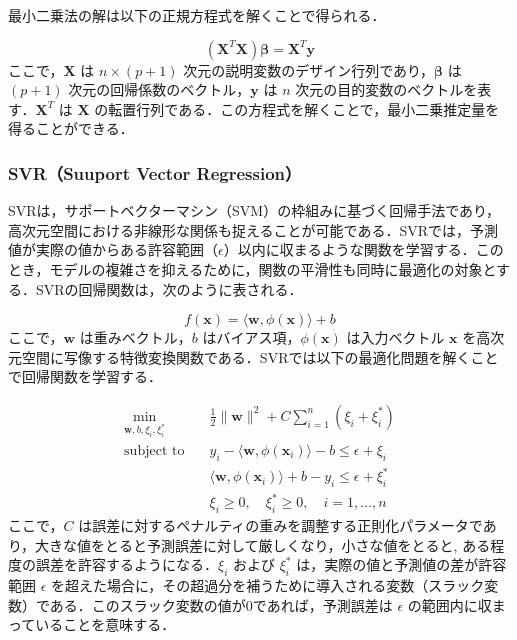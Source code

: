 最小二乗法の解は以下の正規方程式を解くことで得られる．

\begin{equation}
	(\mathbf{X}^T \mathbf{X}) \mathbf{\beta} = \mathbf{X}^T \mathbf{y}
\end{equation}
ここで，$\mathbf{X}$ は $n \times (p+1)$ 次元の説明変数のデザイン行列であり，$\mathbf{\beta}$ は $(p+1)$ 次元の回帰係数のベクトル，$\mathbf{y}$ は $n$ 次元の目的変数のベクトルを表す．$\mathbf{X}^T$ は $\mathbf{X}$ の転置行列である．この方程式を解くことで，最小二乗推定量を得ることができる．

\subsubsection*{SVR（Suuport Vector Regression）}
SVRは，サポートベクターマシン（SVM）の枠組みに基づく回帰手法であり，高次元空間における非線形な関係も捉えることが可能である\cite{prml}．SVRでは，予測値が実際の値からある許容範囲（$\epsilon$）以内に収まるような関数を学習する．このとき，モデルの複雑さを抑えるために，関数の平滑性も同時に最適化の対象とする．SVRの回帰関数は，次のように表される．

\begin{equation}
	f(\mathbf{x}) = \langle \mathbf{w}, \phi(\mathbf{x}) \rangle + b
\end{equation}
ここで，$\mathbf{w}$ は重みベクトル，$b$ はバイアス項，$\phi(\mathbf{x})$ は入力ベクトル $\mathbf{x}$ を高次元空間に写像する特徴変換関数である．SVRでは以下の最適化問題を解くことで回帰関数を学習する．

\begin{align}
	\min_{\mathbf{w}, b, \xi_i, \xi_i^*} \quad & \frac{1}{2} \|\mathbf{w}\|^2 + C \sum_{i=1}^{n} (\xi_i + \xi_i^*) \\
	\text{subject to} \quad 
	& y_i - \langle \mathbf{w}, \phi(\mathbf{x}_i) \rangle - b \leq \epsilon + \xi_i \\
	& \langle \mathbf{w}, \phi(\mathbf{x}_i) \rangle + b - y_i \leq \epsilon + \xi_i^* \\
	& \xi_i \geq 0, \quad \xi_i^* \geq 0, \quad i = 1, \ldots, n
\end{align}
ここで，$C$ は誤差に対するペナルティの重みを調整する正則化パラメータであり，大きな値をとると予測誤差に対して厳しくなり，小さな値をとると,
ある程度の誤差を許容するようになる．$\xi_i$ および $\xi_i^*$ は，実際の値と予測値の差が許容範囲 $\epsilon$ を超えた場合に，その超過分を補うために導入される変数（スラック変数）である．このスラック変数の値が$0$であれば，予測誤差は $\epsilon$ の範囲内に収まっていることを意味する．

